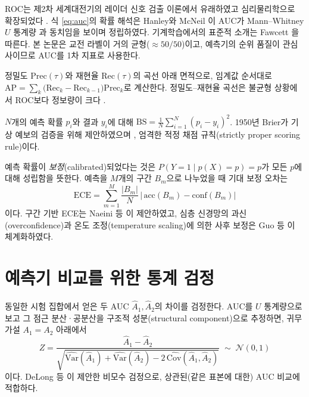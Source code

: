 ROC는 제2차 세계대전기의 레이더 신호 검출 이론에서 유래하였고 심리물리학으로 확장되었다 \cite{green1966signal}. 식 \eqref{eq:auc}의 확률 해석은 Hanley와 McNeil \cite{hanley1982meaning}이 AUC가 Mann--Whitney $U$ 통계량 \cite{mann1947test}과 동치임을 보이며 정립하였다. 기계학습에서의 표준적 소개는 Fawcett \cite{fawcett2006introduction}을 따른다. 본 논문은 교전 라벨이 거의 균형($\approx 50/50$)이고, 예측기의 순위 품질이 관심사이므로 AUC를 1차 지표로 사용한다.

\begin{definition}[평균 정밀도]
정밀도 $\mathrm{Prec}(\tau)$와 재현율 $\mathrm{Rec}(\tau)$의 곡선 아래 면적으로, 임계값 순서대로 $\mathrm{AP} = \sum_k \big(\mathrm{Rec}_k - \mathrm{Rec}_{k-1}\big)\mathrm{Prec}_k$로 계산한다. 정밀도--재현율 곡선은 불균형 상황에서 ROC보다 정보량이 크다 \cite{davis2006relationship}.
\end{definition}

\begin{definition}[Brier 점수]
$N$개의 예측 확률 $p_i$와 결과 $y_i$에 대해 $\mathrm{BS} = \frac{1}{N}\sum_{i=1}^{N}(p_i - y_i)^2$. 1950년 Brier가 기상 예보의 검증을 위해 제안하였으며 \cite{brier1950verification}, 엄격한 적정 채점 규칙(strictly proper scoring rule)이다.
\end{definition}

\begin{definition}[보정과 기대 보정 오차]
예측 확률이 \emph{보정}(calibrated)되었다는 것은 $P(Y=1 \mid p(X)=p) = p$가 모든 $p$에 대해 성립함을 뜻한다. 예측을 $M$개의 구간 $B_m$으로 나누었을 때 기대 보정 오차는
\begin{equation}
  \mathrm{ECE} = \sum_{m=1}^{M} \frac{|B_m|}{N}\,\Big|\,\mathrm{acc}(B_m) - \mathrm{conf}(B_m)\Big|
\end{equation}
이다. 구간 기반 ECE는 Naeini 등 \cite{naeini2015obtaining}이 제안하였고, 심층 신경망의 과신(overconfidence)과 온도 조정(temperature scaling)에 의한 사후 보정은 Guo 등 \cite{guo2017calibration}이 체계화하였다.
\end{definition}

\section{예측기 비교를 위한 통계 검정}
\label{sec:bg-stats}

\begin{definition}[DeLong 검정]
동일한 시험 집합에서 얻은 두 AUC $\hat{A}_1, \hat{A}_2$의 차이를 검정한다. AUC를 $U$ 통계량으로 보고 그 점근 분산·공분산을 구조적 성분(structural component)으로 추정하면, 귀무가설 $A_1 = A_2$ 아래에서
\begin{equation}
  Z = \frac{\hat{A}_1 - \hat{A}_2}{\sqrt{\widehat{\mathrm{Var}}(\hat A_1) + \widehat{\mathrm{Var}}(\hat A_2) - 2\,\widehat{\mathrm{Cov}}(\hat A_1, \hat A_2)}} \;\sim\; \mathcal{N}(0,1)
\end{equation}
이다. DeLong 등 \cite{delong1988comparing}이 제안한 비모수 검정으로, 상관된(같은 표본에 대한) AUC 비교에 적합하다.
\end{definition}

